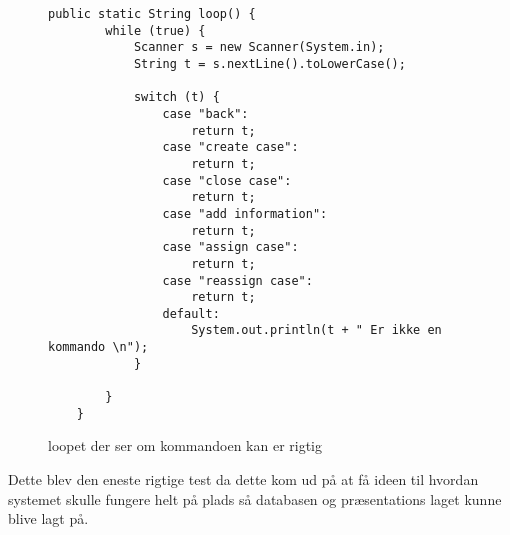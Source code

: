 \begin{figure}[hbt!]
\begin{lstlisting}
public static String loop() {
        while (true) {
            Scanner s = new Scanner(System.in);
            String t = s.nextLine().toLowerCase();

            switch (t) {
                case "back":
                    return t;
                case "create case":
                    return t;
                case "close case":
                    return t;
                case "add information":
                    return t;
                case "assign case":
                    return t;
                case "reassign case":
                    return t;
                default:
                    System.out.println(t + " Er ikke en kommando \n");
            }

        }
    }
\end{lstlisting}
\caption{loopet der ser om kommandoen kan er rigtig}
\label{kode:1commando}
\end{figure}
Dette blev den eneste rigtige test da dette kom ud på at få ideen til hvordan systemet skulle fungere helt på plads så databasen og præsentations laget kunne blive lagt på.
\newpage